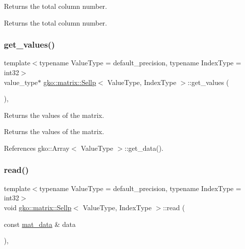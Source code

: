 Returns the total column number. 

\begin{DoxyReturn}{Returns}
the total column number. 
\end{DoxyReturn}
\mbox{\label{classgko_1_1matrix_1_1Sellp_ac9afd5f8000da345844ccb22b599acf7}} 
\subsubsection{\texorpdfstring{get\+\_\+values()}{get\_values()}}
{\footnotesize\ttfamily template$<$typename Value\+Type = default\+\_\+precision, typename Index\+Type = int32$>$ \\
value\+\_\+type$\ast$ \hyperlink{classgko_1_1matrix_1_1Sellp}{gko\+::matrix\+::\+Sellp}$<$ Value\+Type, Index\+Type $>$\+::get\+\_\+values (\begin{DoxyParamCaption}{ }\end{DoxyParamCaption})\hspace{0.3cm}{\ttfamily [inline]}, {\ttfamily [noexcept]}}



Returns the values of the matrix. 

\begin{DoxyReturn}{Returns}
the values of the matrix. 
\end{DoxyReturn}


References gko\+::\+Array$<$ Value\+Type $>$\+::get\+\_\+data().

\mbox{\label{classgko_1_1matrix_1_1Sellp_a2c5ff4a3f190daf7d70bbd8451d13edd}} 
\subsubsection{\texorpdfstring{read()}{read()}}
{\footnotesize\ttfamily template$<$typename Value\+Type = default\+\_\+precision, typename Index\+Type = int32$>$ \\
void \hyperlink{classgko_1_1matrix_1_1Sellp}{gko\+::matrix\+::\+Sellp}$<$ Value\+Type, Index\+Type $>$\+::read (\begin{DoxyParamCaption}\item[{const \hyperlink{structgko_1_1matrix__data}{mat\+\_\+data} \&}]{data }\end{DoxyParamCaption})\hspace{0.3cm}{\ttfamily [override]}, {\ttfamily [virtual]}}




